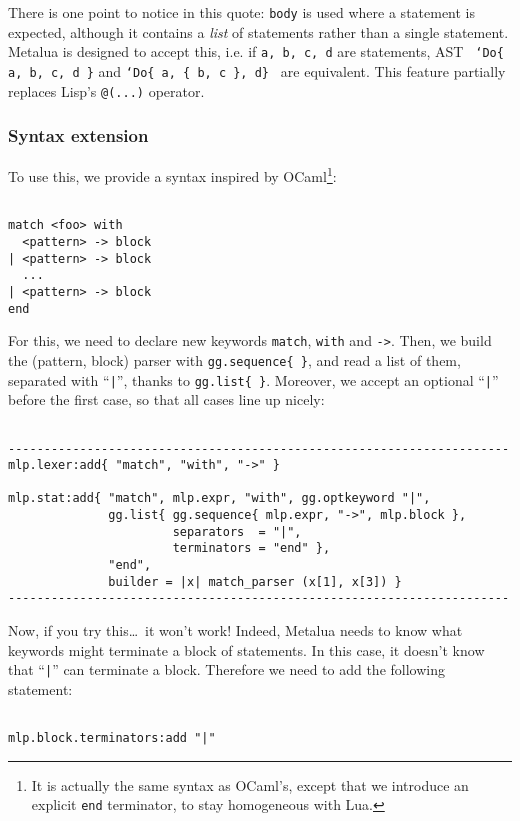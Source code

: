 There is one point to notice in this quote: \verb|body| is used where
a statement is expected, although it contains a {\em list} of
statements rather than a single statement. Metalua is designed to
accept this, i.e. if {\tt a, b, c, d} are statements, AST {\tt
`Do\{  a, b, c, d \}} and {\tt`Do\{ a, \{ b, c \}, d\} } are
equivalent. This feature partially replaces Lisp's \verb|@(...)|
operator.

\subsubsection{Syntax extension}
To use this, we provide a syntax inspired by OCaml\footnote{It is
  actually the same syntax as OCaml's, except that we introduce an
  explicit {\tt end} terminator, to stay homogeneous with Lua.}: 

\begin{Verbatim}[fontsize=\scriptsize]

match <foo> with
  <pattern> -> block
| <pattern> -> block
  ...
| <pattern> -> block
end
\end{Verbatim}

For this, we need to declare new keywords \verb|match|,
\verb|with| and \verb|->|. Then, we build the (pattern, block) parser
with \verb|gg.sequence{ }|, and read a list of them, separated with
``\verb+|+'', thanks to \verb|gg.list{ }|. Moreover, we accept an
optional ``\verb+|+'' before the first case, so that all cases line up
nicely:

\begin{Verbatim}[fontsize=\scriptsize]

----------------------------------------------------------------------
mlp.lexer:add{ "match", "with", "->" }

mlp.stat:add{ "match", mlp.expr, "with", gg.optkeyword "|",
              gg.list{ gg.sequence{ mlp.expr, "->", mlp.block },
                       separators  = "|",
                       terminators = "end" },
              "end",
              builder = |x| match_parser (x[1], x[3]) }
----------------------------------------------------------------------
\end{Verbatim}

\noindent Now, if you try this\ldots\ it won't work! Indeed, Metalua
needs to know what keywords might terminate a block of statements. In
this case, it doesn't know that ``\verb+|+'' can terminate a block.
Therefore we need to add the following statement:

\begin{Verbatim}[fontsize=\scriptsize]

mlp.block.terminators:add "|"
\end{Verbatim}

